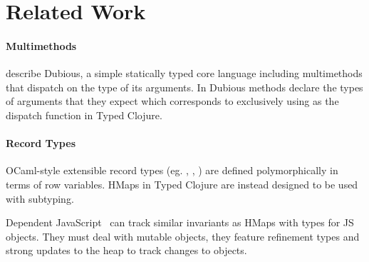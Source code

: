 \section{Related Work}

\paragraph{Multimethods} 
\citet{MS02} describe Dubious, a simple statically typed core language including multimethods that
dispatch on the type of its arguments. 
In Dubious methods declare the types of arguments that they expect which corresponds to
exclusively using  as the dispatch function in Typed Clojure.







\paragraph{Record Types} 
OCaml-style extensible record types (eg. \citet{Wan89}, \citet{CM91}, \citet{HP91})
are defined polymorphically in terms of row variables.
HMaps in Typed Clojure are instead designed to be used with subtyping.

Dependent JavaScript~\cite{Chugh:2012:DTJ} can track similar invariants as HMaps with types
for JS objects. They must deal with mutable objects, they feature refinement types and strong updates to the heap
to track changes to objects.

